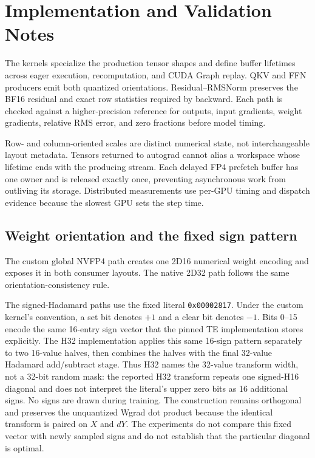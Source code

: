 \section{Implementation and Validation Notes}
\label{app:implementation}

The kernels specialize the production tensor shapes and define buffer
lifetimes across eager execution, recomputation, and CUDA Graph replay. QKV and
FFN producers emit both quantized orientations. Residual--RMSNorm preserves the
BF16 residual and exact row statistics required by backward. Each path is
checked against a higher-precision reference for outputs, input gradients,
weight gradients, relative RMS error, and zero fractions before model timing.

Row- and column-oriented scales are distinct numerical state, not
interchangeable layout metadata. Tensors returned to autograd cannot alias a
workspace whose lifetime ends with the producing stream. Each delayed FP4
prefetch buffer has one owner and is released exactly once, preventing
asynchronous work from outliving its storage. Distributed measurements use
per-GPU timing and dispatch evidence because the slowest GPU sets the step
time.

\subsection{Weight orientation and the fixed sign pattern}

The custom global NVFP4 path creates one 2D16 numerical weight
encoding and exposes it in both consumer layouts. The native 2D32 \mxfp{} path
follows the same orientation-consistency rule.

The signed-Hadamard paths use the fixed literal \texttt{0x00002817}. Under the
custom kernel's convention, a set bit denotes $+1$ and a clear bit denotes
$-1$. Bits 0--15 encode the same 16-entry sign vector that the pinned TE
implementation stores explicitly. The H32 implementation applies this same
16-sign pattern separately to two 16-value halves, then combines the halves
with the final 32-value Hadamard add/subtract stage. Thus H32 names the
32-value transform width, not a 32-bit random mask: the reported H32 transform
repeats one signed-H16 diagonal and does not interpret the literal's upper
zero bits as 16 additional signs. No signs are drawn during training. The
construction remains orthogonal and preserves the unquantized Wgrad dot
product because the identical transform is paired on $X$ and $dY$. The
experiments do not compare this fixed vector with newly sampled signs and do
not establish that the particular diagonal is optimal.

